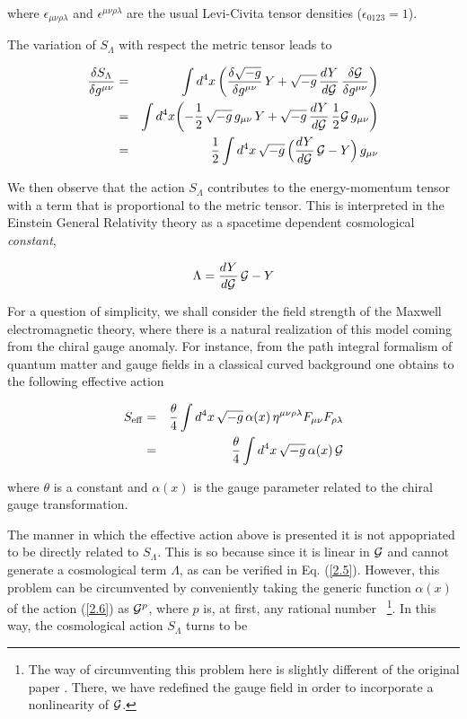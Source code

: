 \documentclass[a4paper,twocolumn,prd,superscriptaddress,nofootinbib,showpacs]
{revtex4}
\begin{document}
\noindent
where $\epsilon_{\mu\nu\rho\lambda}$ and
$\epsilon^{\mu\nu\rho\lambda}$ are the usual Levi-Civita tensor
densities ($\epsilon_{0123}=1$).

\medskip
The variation of $S_\Lambda$ with respect the metric tensor leads to

\begin{eqnarray}
\frac{\delta S_\Lambda}{\delta g^{\mu\nu}}
&=&\int d^4x\,\biggl(\frac{\delta\sqrt{-g}}{\delta g^{\mu\nu}}\,Y
+\sqrt{-g}\,\frac{dY}{d{\cal G}}\,
\frac{\delta{\cal G}}{\delta g^{\mu\nu}}\biggr)
\nonumber\\
&=&\int d^4x\biggl(-\frac{1}{2}\,\sqrt{-g}\,g_{\mu\nu}\,Y
+\sqrt{-g}\,\frac{dY}{d{\cal G}}\,
\frac{1}{2}{\cal G}\,g_{\mu\nu}\biggr)
\nonumber\\
&=&\frac{1}{2}\int d^4x\,\sqrt{-g}\,
\Bigl(\frac{dY}{d{\cal G}}\,{\cal G}-Y\Bigr)\,g_{\mu\nu}
\label{2.4}
\end{eqnarray}

\noindent
We then observe that the action $S_\Lambda$ contributes to the
energy-momentum tensor with a term that is proportional to the metric
tensor. This is interpreted in the Einstein General Relativity theory
as a spacetime dependent cosmological {\it constant},

\begin{equation}
\Lambda=\frac{dY}{d{\cal G}}\,{\cal G}-Y
\label{2.5}
\end{equation}

\medskip
For a question of simplicity, we shall consider the field strength of
the Maxwell electromagnetic theory, where there is a natural
realization of this model coming from the chiral gauge anomaly.
For instance, from the path integral formalism of quantum matter and
gauge fields in a classical curved background one obtains to the
following effective action\cite{Birrell,Novello3}

\begin{eqnarray}
S_{\rm eff}&=&\frac{\theta}{4}\int d^4x\,\sqrt{-g}\,\alpha(x)\,
\eta^{\mu\nu\rho\lambda}F_{\mu\nu}F_{\rho\lambda}
\nonumber\\
&=&\frac{\theta}{4}\int d^4x\,\sqrt{-g}\,\alpha(x)\,{\cal G}
\label{2.6}
\end{eqnarray}

\noindent
where $\theta$ is a constant and $\alpha(x)$ is the gauge parameter
related to the chiral gauge transformation.

\medskip
The manner in which the effective action above is presented it is not
appopriated to be directly related to $S_\Lambda$. This is so because
since it is linear in $\cal G$ and cannot generate a cosmological term
$\Lambda$, as can be verified in Eq. (\ref{2.5}). However, this
problem can be circumvented by conveniently taking the generic
function $\alpha(x)$ of the action (\ref{2.6}) as ${\cal G}^p$, where
$p$ is, at first, any rational number~\empty
\footnote{The way of circumventing this problem here is slightly
different of the original paper \cite{Novello}. There, we have
redefined the gauge field in order to incorporate a nonlinearity of
$\cal G$.}.
In this way, the cosmological action $S_\Lambda$ turns to be
\end{document}
